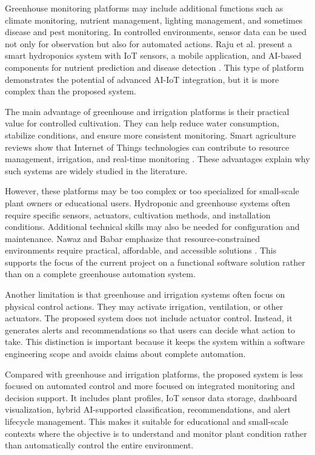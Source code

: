 Greenhouse monitoring platforms may include additional functions such as climate monitoring, nutrient management, lighting management, and sometimes disease and pest monitoring. In controlled environments, sensor data can be used not only for observation but also for automated actions. Raju et al. present a smart hydroponics system with IoT sensors, a mobile application, and AI-based components for nutrient prediction and disease detection \cite{raju2022hydroponics}. This type of platform demonstrates the potential of advanced AI-IoT integration, but it is more complex than the proposed system.

The main advantage of greenhouse and irrigation platforms is their practical value for controlled cultivation. They can help reduce water consumption, stabilize conditions, and ensure more consistent monitoring. Smart agriculture reviews show that Internet of Things technologies can contribute to resource management, irrigation, and real-time monitoring \cite{ahmed2024smart,mowla2023iot}. These advantages explain why such systems are widely studied in the literature.

However, these platforms may be too complex or too specialized for small-scale plant owners or educational users. Hydroponic and greenhouse systems often require specific sensors, actuators, cultivation methods, and installation conditions. Additional technical skills may also be needed for configuration and maintenance. Nawaz and Babar emphasize that resource-constrained environments require practical, affordable, and accessible solutions \cite{nawaz2025iot}. This supports the focus of the current project on a functional software solution rather than on a complete greenhouse automation system.

Another limitation is that greenhouse and irrigation systems often focus on physical control actions. They may activate irrigation, ventilation, or other actuators. The proposed system does not include actuator control. Instead, it generates alerts and recommendations so that users can decide what action to take. This distinction is important because it keeps the system within a software engineering scope and avoids claims about complete automation.

Compared with greenhouse and irrigation platforms, the proposed system is less focused on automated control and more focused on integrated monitoring and decision support. It includes plant profiles, IoT sensor data storage, dashboard visualization, hybrid AI-supported classification, recommendations, and alert lifecycle management. This makes it suitable for educational and small-scale contexts where the objective is to understand and monitor plant condition rather than automatically control the entire environment.

